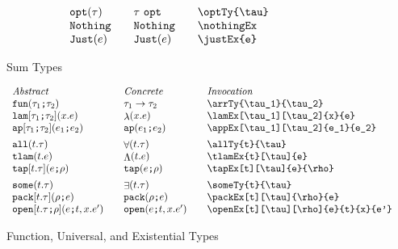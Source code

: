 \documentclass[11pt]{article}
\begin{document}
\begin{figure}
\begin{small}
\begin{displaymath}
\begin{array}{l@{\qquad}l@{\qquad}l@{\qquad}l}
        \optTy{\tau}                      & \optTy*{\tau}           & \verb|\optTy{\tau}| \\
        \nothingEx                        & \nothingEx*             & \verb|\nothingEx| \\
        \justEx{e}                        & \justEx*{e}             & \verb|\justEx{e}|
      \end{array}
    \end{displaymath}
  \end{small}

  \caption{Sum Types}
  \label{fig:sum}
\end{figure}

\begin{figure}
  \begin{small}
    \begin{displaymath}
      \begin{array}{l@{\qquad}l@{\qquad}l@{\qquad}l}
        \textit{Abstract} & \textit{Concrete} & \textit{Invocation} \\
        \arrTy{\tau_1}{\tau_2}              & \arrTy*{\tau_1}{\tau_2}     & \verb|\arrTy{\tau_1}{\tau_2}| \\
        \lamEx[\tau_1][\tau_2]{x}{e}        & \lamEx*{x}{e}               & \verb|\lamEx[\tau_1][\tau_2]{x}{e}|           \\
        \appEx[\tau_1][\tau_2]{e_1}{e_2}    & \appEx*{e_1}{e_2}           & \verb|\appEx[\tau_1][\tau_2]{e_1}{e_2}| \\[1ex]
        \allTy{t}{\tau}                     & \allTy*{t}{\tau}            & \verb|\allTy{t}{\tau}|                     \\
        \tlamEx{t}[\tau]{e}                 & \tlamEx*{t}[\tau]{e}        & \verb|\tlamEx{t}[\tau]{e}|                 \\
        \tapEx[t][\tau]{e}{\rho}            & \tapEx*{e}{\rho}            & \verb|\tapEx[t][\tau]{e}{\rho}|          \\[1ex]
        \someTy{t}{\tau}                    & \someTy*{t}{\tau}           & \verb|\someTy{t}{\tau}|                    \\
        \packEx[t][\tau]{\rho}{e}           & \packEx*{\rho}{e}           & \verb|\packEx[t][\tau]{\rho}{e}|           \\
        \openEx[t][\tau][\rho]{e}{t}{x}{e'} & \openEx*[t][\tau][\rho]{e}{t}{x}{e'} & \verb|\openEx[t][\tau][\rho]{e}{t}{x}{e'}|
      \end{array}
    \end{displaymath}
  \end{small}

  \caption{Function, Universal, and Existential Types}
  \label{fig:fun-poly}
\end{figure}
\end{document}
